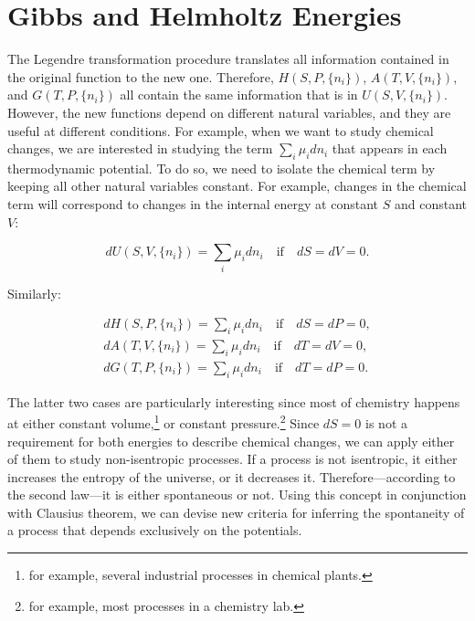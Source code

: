 \documentclass[
  9pt,
]{extbook}
\theoremstyle{definition}
\theoremstyle{definition}
\theoremstyle{definition}
\theoremstyle{definition}
\theoremstyle{remark}
\begin{document}
\section{Gibbs and Helmholtz Energies}\label{freeenergies}

The Legendre transformation procedure translates all information contained in the original function to the new one. Therefore, \(H(S,P,\{n_i\})\), \(A(T,V,\{n_i\})\), and \(G(T,P,\{n_i\})\) all contain the same information that is in \(U(S,V,\{n_i\})\). However, the new functions depend on different natural variables, and they are useful at different conditions. For example, when we want to study chemical changes, we are interested in studying the term \(\sum_i\mu_i dn_i\) that appears in each thermodynamic potential. To do so, we need to isolate the chemical term by keeping all other natural variables constant. For example, changes in the chemical term will correspond to changes in the internal energy at constant \(S\) and constant \(V\):

\begin{equation}
dU(S,V,\{n_i\}) = \sum_i\mu_i dn_i \quad \text{if} \quad dS=dV=0.
\label{eq:duchem}
\end{equation}

Similarly:

\begin{equation}
\begin{aligned}
dH(S,P,\{n_i\}) = \sum_i\mu_i dn_i \quad \text{if} \quad dS=dP=0, \\
dA(T,V,\{n_i\}) = \sum_i\mu_i dn_i \quad \text{if} \quad dT=dV=0, \\
dG(T,P,\{n_i\}) = \sum_i\mu_i dn_i \quad \text{if} \quad dT=dP=0.
\end{aligned}
\label{eq:dhagchem}
\end{equation}

The latter two cases are particularly interesting since most of chemistry happens at either constant volume,\footnote{for example, several industrial processes in chemical plants.} or constant pressure.\footnote{for example, most processes in a chemistry lab.} Since \(dS=0\) is not a requirement for both energies to describe chemical changes, we can apply either of them to study non-isentropic processes. If a process is not isentropic, it either increases the entropy of the universe, or it decreases it. Therefore---according to the second law---it is either spontaneous or not. Using this concept in conjunction with Clausius theorem, we can devise new criteria for inferring the spontaneity of a process that depends exclusively on the potentials.
\end{document}
